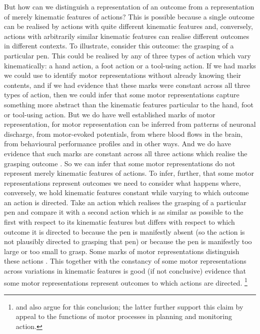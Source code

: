 \documentclass[12pt,\papersize]{extarticle}
\begin{document}
But how can we distinguish a representation of an outcome from a representation of merely kinematic features of actions?  This is possible because a single outcome can be realised by actions with quite different kinematic features and, conversely, actions with arbitrarily similar kinematic features can realise different outcomes in different contexts.  To illustrate, consider this outcome: the grasping of a particular pen. This could be realised by any of three types of action which vary kinematically: a hand action, a foot action or a tool-using action.  If we had marks we could use to identify motor representations without already knowing their contents, and if we had evidence that these marks were constant across all three types of action, then we could infer that some motor representations capture something more abstract than the kinematic features particular to the hand, foot or tool-using action. But we do have well established marks of motor representation, for motor representation can be inferred from patterns of neuronal discharge, from motor-evoked potentials, from where blood flows in the brain, from behavioural performance profiles and in other ways.  And we do have evidence that such marks are constant across all three actions which realise the grasping outcome \citep{rizzolatti:1988_functional, Rizzolatti:2001ug, cattaneo:2010_state-dependent}. So we can infer that some motor representations do not represent merely kinematic features of actions. To infer, further, that some motor representations represent outcomes we need to consider what happens where, conversely, we hold kinematic features constant while varying to which outcome an action is directed. Take an action which realises the grasping of a particular pen and compare it with a second action which is as similar as possible to the first with respect to its kinematic features but differs with respect to which outcome it is directed to because the pen is manifestly absent (so the action is not plausibly directed to grasping that pen) or because the pen is manifestly too large or too small to grasp.  Some marks of motor representations distinguish these actions \citep{Umilta:2001zr, villiger:2010_activity, koch:2010_resonance}.  This together with the constancy of some motor representations across variations in kinematic features is good (if not conclusive) evidence that some motor representations represent outcomes to which actions are directed.%
\footnote{
\citet{pacherie:2008_action} and \citet{butterfill:2012_intention} also argue for this conclusion; the latter further support this claim by appeal to the functions of motor processes in planning and monitoring action.
}
\end{document}
